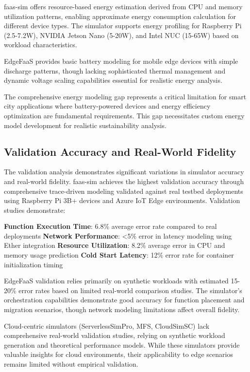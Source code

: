 faas-sim offers resource-based energy estimation derived from CPU and memory utilization patterns, enabling approximate energy consumption calculation for different device types. The simulator supports energy profiling for Raspberry Pi (2.5-7.2W), NVIDIA Jetson Nano (5-20W), and Intel NUC (15-65W) based on workload characteristics.

EdgeFaaS provides basic battery modeling for mobile edge devices with simple discharge patterns, though lacking sophisticated thermal management and dynamic voltage scaling capabilities essential for realistic energy analysis.

The comprehensive energy modeling gap represents a critical limitation for smart city applications where battery-powered devices and energy efficiency optimization are fundamental requirements. This gap necessitates custom energy model development for realistic sustainability analysis.

\subsection{Validation Accuracy and Real-World Fidelity}

The validation analysis demonstrates significant variations in simulator accuracy and real-world fidelity. faas-sim achieves the highest validation accuracy through comprehensive trace-driven modeling validated against real testbed deployments using Raspberry Pi 3B+ devices and Azure IoT Edge environments. Validation studies demonstrate:

\textbf{Function Execution Time}: 6.8\% average error rate compared to real deployments
\textbf{Network Performance}: <5\% error in latency modeling using Ether integration
\textbf{Resource Utilization}: 8.2\% average error in CPU and memory usage prediction
\textbf{Cold Start Latency}: 12\% error rate for container initialization timing

EdgeFaaS validation relies primarily on synthetic workloads with estimated 15-20\% error rates based on limited real-world comparison studies. The simulator's orchestration capabilities demonstrate good accuracy for function placement and migration scenarios, though network modeling limitations affect overall fidelity.

Cloud-centric simulators (ServerlessSimPro, MFS, CloudSimSC) lack comprehensive real-world validation studies, relying on synthetic workload generation and theoretical performance models. While these simulators provide valuable insights for cloud environments, their applicability to edge scenarios remains limited without empirical validation.

